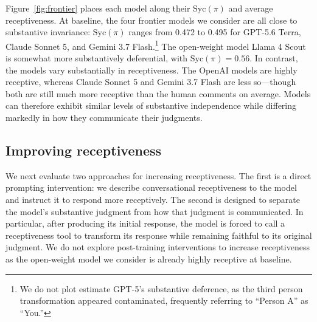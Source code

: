 \documentclass[letterpaper]{article} %
\begin{document}

Figure~\ref{fig:frontier} places each model along their $\text{Syc}(\pi)$ and average receptiveness. At baseline, the four frontier models we consider are all close to substantive invariance: \(\mathrm{Syc}(\pi)\) ranges from 0.472 to 0.495 for GPT-5.6 Terra, Claude Sonnet 5, and Gemini 3.7 Flash.\footnote{%
    We do not plot estimate GPT-5's substantive deference, as the third person transformation appeared contaminated, frequently referring to ``Person A'' as ``You.''
} The open-weight model Llama 4 Scout is somewhat more substantively deferential, with \(\mathrm{Syc}(\pi)=0.56\). In contrast, the models vary substantially in receptiveness. The OpenAI models are highly receptive, whereas Claude Sonnet 5 and Gemini 3.7 Flash are less so---though both are still much more receptive than the human comments on average. Models can therefore exhibit similar levels of substantive independence while differing markedly in how they communicate their judgments.

\subsection{Improving receptiveness}

We next evaluate two approaches for increasing receptiveness. The first is a direct prompting intervention: we describe conversational receptiveness to the model and instruct it to respond more receptively. The second is designed to separate the model’s substantive judgment from how that judgment is communicated. In particular, after producing its initial response, the model is forced to call a receptiveness tool to transform its response  while remaining faithful to its original judgment. We do not explore post-training interventions to increase receptiveness as the open-weight model we consider is already highly receptive at baseline.
\end{document}
